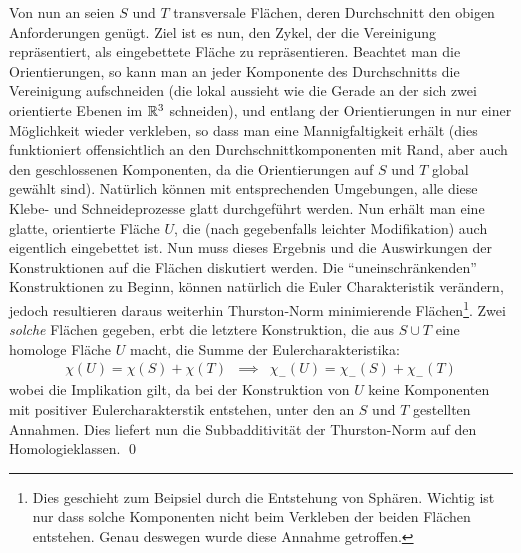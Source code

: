             Von nun an seien $S$ und $T$ transversale Flächen, deren Durchschnitt den obigen Anforderungen genügt. Ziel ist es nun, den Zykel, der die Vereinigung repräsentiert, als eingebettete Fläche zu repräsentieren. Beachtet man die Orientierungen, so kann man an jeder Komponente des Durchschnitts die Vereinigung aufschneiden (die lokal aussieht wie die Gerade an der sich zwei orientierte Ebenen im $\mathbb{R}^3$ schneiden), und entlang der Orientierungen in nur einer Möglichkeit wieder verkleben, so dass man eine Mannigfaltigkeit erhält (dies funktioniert offensichtlich an den Durchschnittkomponenten mit Rand, aber auch den geschlossenen Komponenten, da die Orientierungen auf $S$ und $T$ global gewählt sind). Natürlich können mit entsprechenden Umgebungen, alle diese Klebe- und Schneideprozesse glatt durchgeführt werden. Nun erhält man eine glatte, orientierte Fläche $U$, die (nach gegebenfalls leichter Modifikation) auch eigentlich eingebettet ist. Nun muss dieses Ergebnis und die Auswirkungen der Konstruktionen auf die Flächen diskutiert werden. Die "`uneinschränkenden"' Konstruktionen zu Beginn, können natürlich die Euler Charakteristik verändern, jedoch resultieren daraus weiterhin Thurston-Norm minimierende Flächen\footnote{Dies geschieht zum Beipsiel durch die Entstehung von Sphären. Wichtig ist nur dass solche Komponenten nicht beim Verkleben der beiden Flächen entstehen. Genau deswegen wurde diese Annahme getroffen.}. Zwei \emph{solche} Flächen gegeben, erbt die letztere Konstruktion, die aus $S\cup T$ eine homologe Fläche $U$ macht, die Summe der Eulercharakteristika:
            \begin{eqnarray*}
                \chi(U) = \chi(S) + \chi(T) &\implies& \chi_-(U)=\chi_-(S) + \chi_-(T) 
            \end{eqnarray*}
            wobei die Implikation gilt, da bei der Konstruktion von $U$ keine Komponenten mit positiver Eulercharakterstik entstehen, unter den an $S$ und $T$ gestellten Annahmen. Dies liefert nun die Subbadditivität der Thurston-Norm auf den Homologieklassen.
        \qed
        \vspace{6pt}

